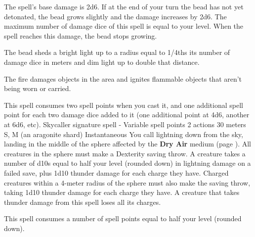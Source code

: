    The spell's base damage is 2d6.
    If at the end of your turn the bead has not yet detonated, the bead grows slightly and the damage increases by 2d6.
    The maximum number of damage dice of this spell is equal to your level.
    When the spell reaches this damage, the bead stops growing.

    The bead sheds a bright light up to a radius equal to 1/4ths its number of damage dice in meters and dim light up to double that distance.

    The fire damages objects in the area and ignites flammable objects that aren't being worn or carried.

    This spell consumes two spell points when you cast it, and one additional spell point for each two damage dice added to it (one additional point at 4d6, another at 6d6, etc).
    {Skycaller signature spell - Variable spell points}
    {2 actions}
    {30 meters}
    {S, M (an aragonite shard)}
    {Instantaneous}
    You call lightning down from the sky, landing in the middle of the sphere affected by the \textbf{Dry Air} medium (page \pageref{medium::dryair}).
    All creatures in the sphere must make a Dexterity saving throw.
    A creature takes a number of d10s equal to half your level (rounded down) in lightning damage on a failed save, plus 1d10 thunder damage for each charge they have.
    Charged creatures within a 4-meter radius of the sphere must also make the saving throw, taking 1d10 thunder damage for each charge they have.
    A creature that takes thunder damage from this spell loses all its charges.

    This spell consumes a number of spell points equal to half your level (rounded down).

\newpage~\newpage
